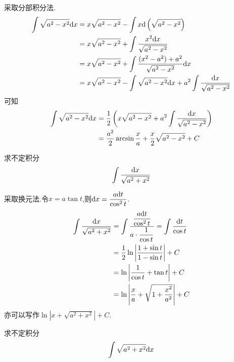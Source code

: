 \documentclass{ctexart}
\begin{document}
\begin{solution}
    采取分部积分法.
    $$\begin{aligned}
        \int{\sqrt{a^2-x^2}\mathrm{d}x} 
        &= x\sqrt{a^2-x^2}-\int{x\mathrm{d}\left(\sqrt{a^2-x^2}\right)} \\
        &= x\sqrt{a^2-x^2}+\int{\dfrac{x^2\mathrm{d}x}{\sqrt{a^2-x^2}}} \\
        &= x\sqrt{a^2-x^2}+\int{\dfrac{(x^2-a^2)+a^2}{\sqrt{a^2-x^2}}\mathrm{d}x} \\
        &= x\sqrt{a^2-x^2}-\int{\sqrt{a^2-x^2}\mathrm{d}x}+a^2\int{\dfrac{\mathrm{d}x}{\sqrt{a^2-x^2}}}
    \end{aligned}$$
    可知
    $$\begin{aligned}
        \int{\sqrt{a^2-x^2}\mathrm{d}x} 
        &= \dfrac{1}{2}\left( x\sqrt{a^2-x^2}+a^2\int{\dfrac{\mathrm{d}x}{\sqrt{a^2-x^2}}}\right) \\
        &= \dfrac{a^2}{2}\arcsin{\dfrac{x}{a}}+\dfrac{x}{2}\sqrt{a^2-x^2}+C
    \end{aligned}$$
\end{solution}
\begin{problem}[Example 8.]
    求不定积分$$\int{\dfrac{\mathrm{d}x}{\sqrt{a^2+x^2}}}$$
\end{problem}
\begin{solution}[Solution.]
    采取换元法.令$x=a\tan{t}$,则$\mathrm{d} x=\dfrac{a\mathrm{d} t}{\cos^2{t}}$.
    $$\begin{aligned}
        \int{\dfrac{\mathrm{d}x}{\sqrt{a^2+x^2}}} 
        &= \int{\dfrac{\dfrac{a\mathrm{d}t}{\cos^2{t}}}{a\cdot\dfrac{1}{\cos{t}}}} = \int{\dfrac{\mathrm{d}t}{\cos{t}}} \\
        &= \dfrac{1}{2}\ln\left\lvert\dfrac{1+\sin{t}}{1-\sin{t}}\right\rvert+C \\
        &= \ln{\left\lvert\dfrac{1}{\cos{t}}+\tan{t}\right\rvert}+C \\
        &= \ln{\left\lvert\dfrac{x}{a}+\sqrt{1+\dfrac{x^2}{a^2}}\right\rvert}+C \\
    \end{aligned}$$
    亦可以写作$\ln{\left\lvert x+\sqrt{a^2+x^2}\right\rvert}+C$.
\end{solution}
\begin{problem}[Example 9.]
    求不定积分$$\int{\sqrt{a^2+x^2}\mathrm{d}x}$$
\end{problem}
\end{document}
